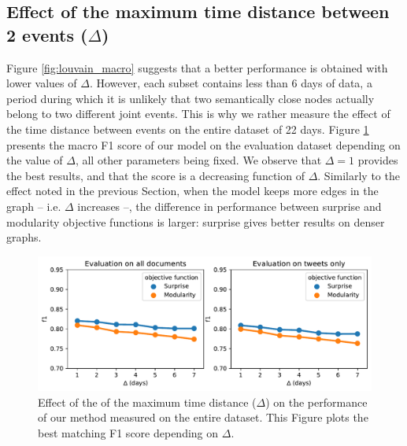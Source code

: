 \subsection{Effect of the maximum time distance between 2 events ($\Delta$)}

Figure \ref{fig:louvain_macro} suggests that a better performance is obtained with lower values of $\Delta$. However, each subset contains less than 6 days of data, a period during which it is unlikely that two semantically close nodes actually belong to two different joint events. This is why we rather measure the effect of the time distance between events on the entire dataset of 22 days. Figure \ref{fig:louvain_macro_days} presents the macro F1 score of our model on the evaluation dataset depending on the value of $\Delta$, all other parameters being fixed. We observe that $\Delta=1$ provides the best results, and that the score is a decreasing function of $\Delta$. Similarly to the effect noted in the previous Section, when the model keeps more edges in the graph -- i.e. $\Delta$ increases --, the difference in performance between surprise and modularity objective functions is larger: surprise gives better results on denser graphs.

\begin{figure}
    \centering
    \includegraphics[width=1\textwidth]{figures/louvain_macro_days_all_corpus.pdf}
    \caption[Effect of the of the maximum time distance on the performance of our method]{Effect of the of the maximum time distance ($\Delta$) on the performance of our method measured on the entire dataset. This Figure plots the best matching F1 score depending on $\Delta$.}
    \label{fig:louvain_macro_days}
\end{figure}
